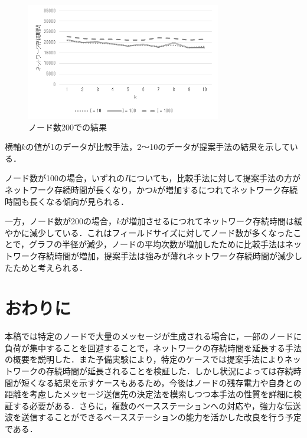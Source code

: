 \documentclass[a4j,10pt]{jarticle}
\begin{document}
\begin{figure}[h]
  \begin{center}
  \includegraphics[width=8.5cm,clip]{./N200.png}
  \vspace{-8mm}
  \caption{ノード数200での結果}
  \label{graph:N200}
  \end{center}
\end{figure}

横軸$k$の値が1のデータが比較手法，2～10のデータが提案手法の結果を示している．

ノード数が100の場合，いずれの$I$についても，比較手法に対して提案手法の方がネットワーク存続時間が長くなり，かつ$k$が増加するにつれてネットワーク存続時間も長くなる傾向が見られる．

一方，ノード数が200の場合，$k$が増加させるにつれてネットワーク存続時間は緩やかに減少している．これはフィールドサイズに対してノード数が多くなったことで，グラフの半径が減少，ノードの平均次数が増加したために比較手法はネットワーク存続時間が増加，提案手法は強みが薄れネットワーク存続時間が減少したためと考えられる．


\section{おわりに}
本稿では特定のノードで大量のメッセージが生成される場合に，一部のノードに負荷が集中することを回避することで，ネットワークの存続時間を延長する手法の概要を説明した．また予備実験により，特定のケースでは提案手法によりネットワークの存続時間が延長されることを検証した．しかし状況によっては存続時間が短くなる結果を示すケースもあるため，今後はノードの残存電力や自身との距離を考慮したメッセージ送信先の決定法を模索しつつ本手法の性質を詳細に検証する必要がある．さらに，複数のベースステーションへの対応や，強力な伝送波を送信することができるベースステーションの能力を活かした改良を行う予定である．
\end{document}
